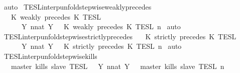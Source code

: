 \begin{isabellebody}
%
\isadelimproof
%
\endisadelimproof
%
\isatagproof
{}\isamarkupfalse%
\ auto%
\endisatagproof
{\isafoldproof}%
%
\isadelimproof
\isanewline
%
\endisadelimproof
\isanewline
{}\isamarkupfalse%
\ TESL{\isacharunderscore}interp{\isacharunderscore}unfold{\isacharunderscore}stepwise{\isacharunderscore}weakly{\isacharunderscore}precedes{\isacharcolon}\isanewline
\ \ {\isacartoucheopen}{\isasymlbrakk}\ K\ weakly\ precedes\ K\ {\isasymrbrakk}\isactrlsub T\isactrlsub E\isactrlsub S\isactrlsub L\isanewline
\ \ \ \ {\isacharequal}\ {\isasymInter}\ {\isacharbraceleft}Y{\isachardot}\ {\isasymexists}n{\isacharcolon}{\isacharcolon}nat{\isachardot}\ Y\ {\isacharequal}\ {\isasymlbrakk}\ K\ weakly\ precedes\ K\ {\isasymrbrakk}\isactrlsub T\isactrlsub E\isactrlsub S\isactrlsub L\isactrlbsup {\isasymge}\ n\isactrlesup {\isacharbraceright}{\isacartoucheclose}\isanewline
%
\isadelimproof
%
\endisadelimproof
%
\isatagproof
{}\isamarkupfalse%
\ auto%
\endisatagproof
{\isafoldproof}%
%
\isadelimproof
\isanewline
%
\endisadelimproof
\isanewline
{}\isamarkupfalse%
\ TESL{\isacharunderscore}interp{\isacharunderscore}unfold{\isacharunderscore}stepwise{\isacharunderscore}strictly{\isacharunderscore}precedes{\isacharcolon}\isanewline
\ \ {\isacartoucheopen}{\isasymlbrakk}\ K\ strictly\ precedes\ K\ {\isasymrbrakk}\isactrlsub T\isactrlsub E\isactrlsub S\isactrlsub L\isanewline
\ \ \ \ {\isacharequal}\ {\isasymInter}\ {\isacharbraceleft}Y{\isachardot}\ {\isasymexists}n{\isacharcolon}{\isacharcolon}nat{\isachardot}\ Y\ {\isacharequal}\ {\isasymlbrakk}\ K\ strictly\ precedes\ K\ {\isasymrbrakk}\isactrlsub T\isactrlsub E\isactrlsub S\isactrlsub L\isactrlbsup {\isasymge}\ n\isactrlesup {\isacharbraceright}{\isacartoucheclose}\isanewline
%
\isadelimproof
%
\endisadelimproof
%
\isatagproof
{}\isamarkupfalse%
\ auto%
\endisatagproof
{\isafoldproof}%
%
\isadelimproof
\isanewline
%
\endisadelimproof
\isanewline
{}\isamarkupfalse%
\ TESL{\isacharunderscore}interp{\isacharunderscore}unfold{\isacharunderscore}stepwise{\isacharunderscore}kills{\isacharcolon}\isanewline
\ \ {\isacartoucheopen}{\isasymlbrakk}\ master\ kills\ slave\ {\isasymrbrakk}\isactrlsub T\isactrlsub E\isactrlsub S\isactrlsub L\ {\isacharequal}\ {\isasymInter}\ {\isacharbraceleft}Y{\isachardot}\ {\isasymexists}n{\isacharcolon}{\isacharcolon}nat{\isachardot}\ Y\ {\isacharequal}\ {\isasymlbrakk}\ master\ kills\ slave\ {\isasymrbrakk}\isactrlsub T\isactrlsub E\isactrlsub S\isactrlsub L\isactrlbsup {\isasymge}\ n\isactrlesup {\isacharbraceright}{\isacartoucheclose}\isanewline

\end{isabellebody}
